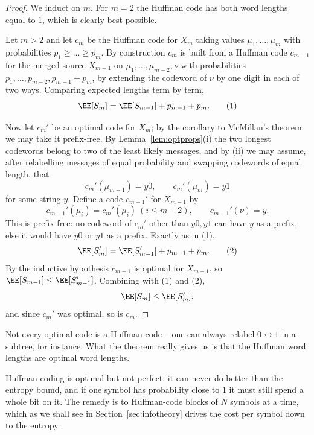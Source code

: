 \begin{proof}
	We induct on $m$. For $m = 2$ the Huffman code has both word lengths equal to $1$, which is clearly best possible.

	Let $m > 2$ and let $c_m$ be the Huffman code for $X_m$ taking values $\mu_1, \dots, \mu_m$ with probabilities $p_1 \ge \dots \ge p_m$. By construction $c_m$ is built from a Huffman code $c_{m-1}$ for the merged source $X_{m-1}$ on $\mu_1, \dots, \mu_{m-2}, \nu$ with probabilities $p_1, \dots, p_{m-2}, p_{m-1}+p_m$, by extending the codeword of $\nu$ by one digit in each of two ways. Comparing expected lengths term by term,
	\begin{equation*}\EE[S_m] = \EE[S_{m-1}] + p_{m-1} + p_m. \tag{1}\end{equation*}

	Now let $c_m'$ be an optimal code for $X_m$; by the corollary to McMillan's theorem we may take it prefix-free. By Lemma~\ref{lem:optprops}(i) the two longest codewords belong to two of the least likely messages, and by (ii) we may assume, after relabelling messages of equal probability and swapping codewords of equal length, that
	$$c_m'(\mu_{m-1}) = y0, \qquad c_m'(\mu_m) = y1$$
	for some string $y$. Define a code $c_{m-1}'$ for $X_{m-1}$ by
	$$c_{m-1}'(\mu_i) = c_m'(\mu_i) \ (i \le m-2), \qquad c_{m-1}'(\nu) = y.$$
	This is prefix-free: no codeword of $c_m'$ other than $y0, y1$ can have $y$ as a prefix, else it would have $y0$ or $y1$ as a prefix. Exactly as in (1),
	\begin{equation*}\EE[S_m'] = \EE[S_{m-1}'] + p_{m-1} + p_m. \tag{2}\end{equation*}
	By the inductive hypothesis $c_{m-1}$ is optimal for $X_{m-1}$, so $\EE[S_{m-1}] \le \EE[S_{m-1}']$. Combining with (1) and (2),
	$$\EE[S_m] \le \EE[S_m'],$$
	and since $c_m'$ was optimal, so is $c_m$.
\end{proof}

\begin{remark}
	Not every optimal code is a Huffman code -- one can always relabel $0 \leftrightarrow 1$ in a subtree, for instance. What the theorem really gives us is that the Huffman word lengths are optimal word lengths.

	Huffman coding is optimal but not perfect: it can never do better than the entropy bound, and if one symbol has probability close to $1$ it must still spend a whole bit on it. The remedy is to Huffman-code blocks of $N$ symbols at a time, which as we shall see in Section~\ref{sec:infotheory} drives the cost per symbol down to the entropy.
\end{remark}

